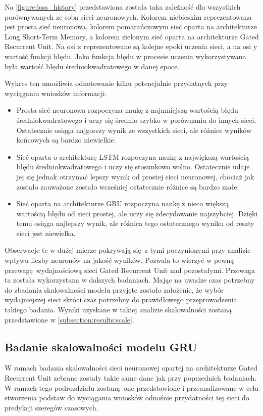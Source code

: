 \documentclass[10pt,a4paper]{article}
\begin{document}
Na \autoref{figure:loss_history} przedstawiona została taka zależność dla wszystkich porównywanych ze sobą sieci neuronowych. Kolorem niebieskim reprezentowana jest prosta sieć neuronowa, kolorem pomarańczowym sieć oparta na architekturze Long Short-Term Memory, a kolorem zielonym sieć oparta na architekturze Gated Recurrent Unit. Na osi x reprezentowane są kolejne epoki uczenia sieci, a na osi y wartość funkcji błędu. Jako funkcja błędu w procesie uczenia wykorzystywana była wartość błędu średniokwadratowego w danej epoce. 

Wykres ten umożliwia odnotowanie kilku potencjalnie przydatnych przy wyciąganiu wniosków informacji:
\begin{itemize}
	\item Prosta sieć neuronowa rozpoczyna naukę z najmniejszą wartością błędu średniokwadratowego i uczy się średnio szybko w porównaniu do innych sieci. Ostatecznie osiąga najgorszy wynik ze wszystkich sieci, ale różnice wyników końcowych są bardzo niewielkie.
	\item Sieć oparta o architekturę LSTM rozpoczyna naukę z największą wartością błędu średniokwadratowego i uczy się stosunkowo wolno. Ostatecznie udaje jej się jednak otrzymać lepszy wynik od prostej sieci neuronowej, chociaż jak zostało zauważone zostało wcześniej ostatecznie różnice są bardzo małe.
	\item Sieć oparta na architekturze GRU rozpoczyna naukę z nieco większą wartością błędu od sieci prostej, ale uczy się zdecydowanie najszybciej. Dzięki temu osiąga najlepszy wynik, ale różnica tego ostatecznego wyniku od reszty sieci jest niewielka. 
\end{itemize}

Obserwacje te w dużej mierze pokrywają się z tymi poczynionymi przy analizie wpływu liczby neuronów na jakość wyników. Pozwala to wierzyć w pewną przewagę wydajnościową sieci Gated Recurrent Unit nad pozostałymi. Przewaga ta została wykorzystana w dalszych badaniach. Mając na uwadze czas potrzebny do zbadania skalowalności modelu przyjęte zostało założenie, że wybór wydajniejszej sieci skróci czas potrzebny do prawidłowego przeprowadzenia takiego badania. Wyniki uzyskane w takiej analizie skalowalności zostaną przedstawione w \autoref{subsection:results:scale}.

\subsection{Badanie skalowalności modelu GRU}
\label{subsection:results:scale}
W ramach badania skalowalności sieci neuronowej opartej na architekturze Gated Recurrent Unit zebrane zostały takie same dane jak przy poprzednich badaniach. W ramach tego podrozdziału zostaną one przedstawione i przeanalizowane w celu stworzenia podstaw do wyciągania wniosków odnośnie przydatności tej sieci do predykcji szeregów czasowych. 
\end{document}
